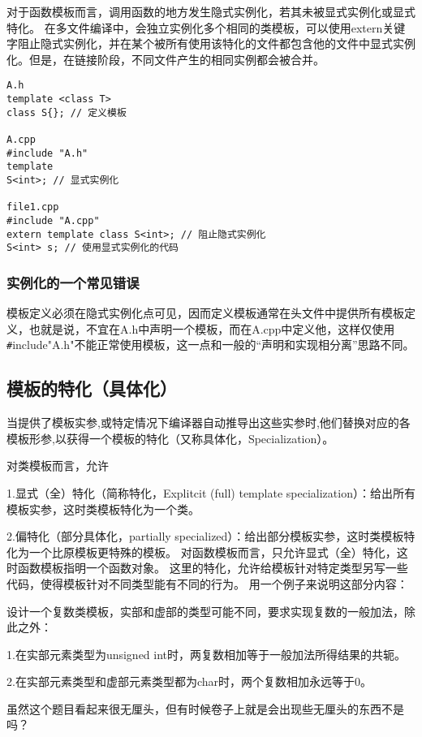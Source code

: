 \documentclass[UTF8]{ctexart}
\begin{document}
对于函数模板而言，调用函数的地方发生隐式实例化，若其未被显式实例化或显式特化。
在多文件编译中，会独立实例化多个相同的类模板，可以使用extern关键字阻止隐式实例化，并在某个被所有使用该特化的文件都包含他的文件中显式实例化。但是，在链接阶段，不同文件产生的相同实例都会被合并。
\begin{lstlisting}
A.h
template <class T>
class S{}; // 定义模板

A.cpp
#include "A.h"
template
S<int>; // 显式实例化

file1.cpp
#include "A.cpp"
extern template class S<int>; // 阻止隐式实例化
S<int> s; // 使用显式实例化的代码
\end{lstlisting}

\subsubsection{实例化的一个常见错误}
模板定义必须在隐式实例化点可见，因而定义模板通常在头文件中提供所有模板定义，也就是说，不宜在A.h中声明一个模板，而在A.cpp中定义他，这样仅使用\verb|#|include"A.h"不能正常使用模板，这一点和一般的“声明和实现相分离”思路不同。

\subsection{模板的特化（具体化）}
当提供了模板实参,或特定情况下编译器自动推导出这些实参时,他们替换对应的各模板形参,以获得一个模板的特化（又称具体化，Specialization）。

对类模板而言，允许

1.显式（全）特化（简称特化，Explitcit (full) template specialization）：给出所有模板实参，这时类模板特化为一个类。

2.偏特化（部分具体化，partially specialized）：给出部分模板实参，这时类模板特化为一个比原模板更特殊的模板。 对函数模板而言，只允许显式（全）特化，这时函数模板指明一个函数对象。 这里的特化，允许给模板针对特定类型另写一些代码，使得模板针对不同类型能有不同的行为。 用一个例子来说明这部分内容：

设计一个复数类模板，实部和虚部的类型可能不同，要求实现复数的一般加法，除此之外：

1.在实部元素类型为unsigned int时，两复数相加等于一般加法所得结果的共轭。

2.在实部元素类型和虚部元素类型都为char时，两个复数相加永远等于0。

虽然这个题目看起来很无厘头，但有时候卷子上就是会出现些无厘头的东西不是吗？
\end{document}
